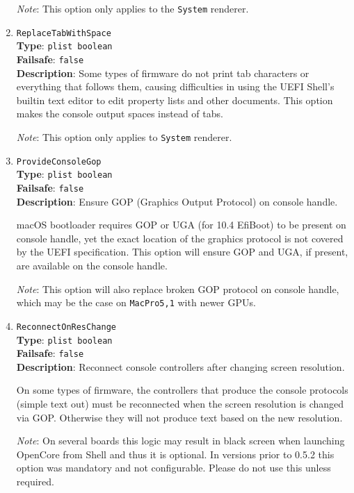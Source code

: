 \documentclass[]{article}
\begin{document}
\begin{enumerate}
  \emph{Note}: This option only applies to the \texttt{System} renderer.

\item
  \texttt{ReplaceTabWithSpace}\\
  \textbf{Type}: \texttt{plist\ boolean}\\
  \textbf{Failsafe}: \texttt{false}\\
  \textbf{Description}: Some types of firmware do not print tab characters or everything
  that follows them, causing difficulties in using the UEFI Shell's builtin
  text editor to edit property lists and other documents. This option makes the console
  output spaces instead of tabs.

  \emph{Note}: This option only applies to \texttt{System} renderer.

\item
  \texttt{ProvideConsoleGop}\\
  \textbf{Type}: \texttt{plist\ boolean}\\
  \textbf{Failsafe}: \texttt{false}\\
  \textbf{Description}: Ensure GOP (Graphics Output Protocol) on console handle.

  macOS bootloader requires GOP or UGA (for 10.4 EfiBoot) to be present on console
  handle, yet the exact location of the graphics protocol is not covered by the
  UEFI specification. This option will ensure GOP and UGA, if present, are available
  on the console handle.

  \emph{Note}: This option will also replace broken GOP protocol on console handle,
  which may be the case on \texttt{MacPro5,1} with newer GPUs.

\item
  \texttt{ReconnectOnResChange}\\
  \textbf{Type}: \texttt{plist\ boolean}\\
  \textbf{Failsafe}: \texttt{false}\\
  \textbf{Description}: Reconnect console controllers after changing screen resolution.

  On some types of firmware, the controllers that produce the console protocols
  (simple text out) must be reconnected when the screen resolution is changed via GOP.
  Otherwise they will not produce text based on the new resolution.

  \emph{Note}: On several boards this logic may result in black screen when launching
  OpenCore from Shell and thus it is optional. In versions prior to 0.5.2 this option
  was mandatory and not configurable. Please do not use this unless required.


\end{enumerate}
\end{document}
